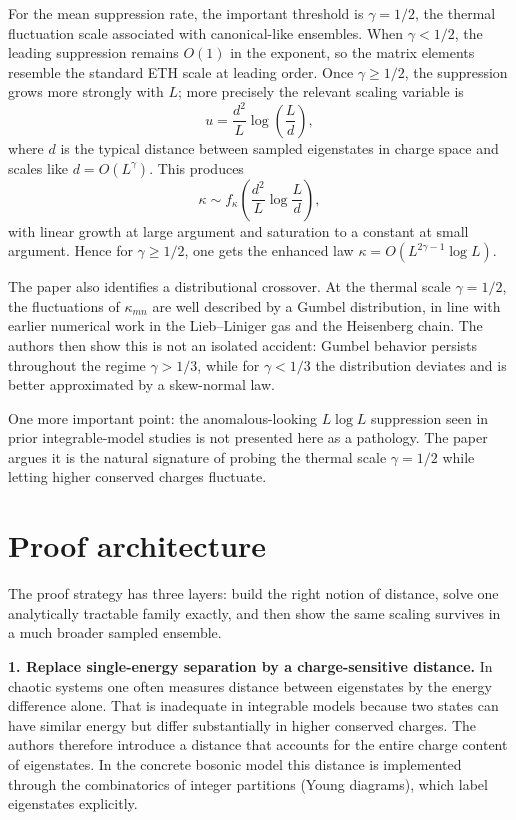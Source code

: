 \documentclass[11pt]{article}
\begin{document}
For the mean suppression rate, the important threshold is $\gamma=1/2$, the thermal fluctuation scale associated with canonical-like ensembles. When $\gamma<1/2$, the leading suppression remains $O(1)$ in the exponent, so the matrix elements resemble the standard ETH scale at leading order. Once $\gamma\ge 1/2$, the suppression grows more strongly with $L$; more precisely the relevant scaling variable is
\[
u = \frac{d^2}{L}\log\!\left(\frac{L}{d}\right),
\]
where $d$ is the typical distance between sampled eigenstates in charge space and scales like $d=O(L^\gamma)$. This produces
\[
\kappa \sim f_\kappa\!\left(\frac{d^2}{L}\log\!\frac{L}{d}\right),
\]
with linear growth at large argument and saturation to a constant at small argument. Hence for $\gamma\ge 1/2$, one gets the enhanced law $\kappa = O(L^{2\gamma-1}\log L)$.

The paper also identifies a distributional crossover. At the thermal scale $\gamma=1/2$, the fluctuations of $\kappa_{mn}$ are well described by a Gumbel distribution, in line with earlier numerical work in the Lieb--Liniger gas and the Heisenberg chain. The authors then show this is not an isolated accident: Gumbel behavior persists throughout the regime $\gamma>1/3$, while for $\gamma<1/3$ the distribution deviates and is better approximated by a skew-normal law.

One more important point: the anomalous-looking $L\log L$ suppression seen in prior integrable-model studies is not presented here as a pathology. The paper argues it is the natural signature of probing the thermal scale $\gamma=1/2$ while letting higher conserved charges fluctuate.

\section*{Proof architecture}
The proof strategy has three layers: build the right notion of distance, solve one analytically tractable family exactly, and then show the same scaling survives in a much broader sampled ensemble.

\textbf{1. Replace single-energy separation by a charge-sensitive distance.}
In chaotic systems one often measures distance between eigenstates by the energy difference alone. That is inadequate in integrable models because two states can have similar energy but differ substantially in higher conserved charges. The authors therefore introduce a distance that accounts for the entire charge content of eigenstates. In the concrete bosonic model this distance is implemented through the combinatorics of integer partitions (Young diagrams), which label eigenstates explicitly.
\end{document}
